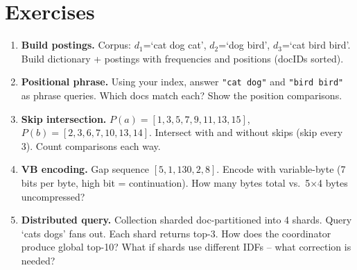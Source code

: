 \section{Exercises}
\begin{enumerate}[label=E4.\arabic*, leftmargin=*, itemsep=0.6em]
  \item \textbf{Build postings.} Corpus: $d_1$=`cat dog cat', $d_2$=`dog bird', $d_3$=`cat bird bird'. Build dictionary + postings with frequencies and positions (docIDs sorted).
  \item \textbf{Positional phrase.} Using your index, answer \texttt{"cat dog"} and \texttt{"bird bird"} as phrase queries. Which docs match each? Show the position comparisons.
  \item \textbf{Skip intersection.} $P(a)=[1,3,5,7,9,11,13,15]$, $P(b)=[2,3,6,7,10,13,14]$. Intersect with and without skips (skip every 3). Count comparisons each way.
  \item \textbf{VB encoding.} Gap sequence $[5, 1, 130, 2, 8]$. Encode with variable-byte (7 bits per byte, high bit = continuation). How many bytes total vs.\ 5$\times$4 bytes uncompressed?
  \item \textbf{Distributed query.} Collection sharded doc-partitioned into 4 shards. Query `cats dogs' fans out. Each shard returns top-3. How does the coordinator produce global top-10? What if shards use different IDFs -- what correction is needed?
\end{enumerate}

